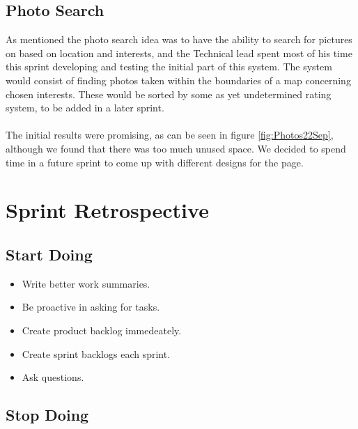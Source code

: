 \subsection*{Photo Search}
As mentioned the photo search idea was to have the ability to search for pictures on based on location and interests, and the Technical lead spent most of his time this sprint developing and testing the initial part of this system. The system would consist of finding photos taken within the boundaries of a map concerning chosen interests. These would be sorted by some as yet undetermined rating system, to be added in a later sprint.
\paragraph*{} The initial results were promising, as can be seen in figure \ref{fig:Photos22Sep}, although we found that there was too much unused space. We decided to spend time in a future sprint to come up with different designs for the page.

\section{Sprint Retrospective}
\label{sec:S1Retrospective}


\subsection{Start Doing}
\label{subsec:S1RetrospectiveStart}

\begin{itemize}
  \item Write better work summaries.
  \item Be proactive in asking for tasks.
  \item Create product backlog immedeately.
  \item Create sprint backlogs each sprint.
  \item Ask questions.
\end{itemize}

\subsection{Stop Doing}
\label{subsec:S1RetrospectiveStop}

